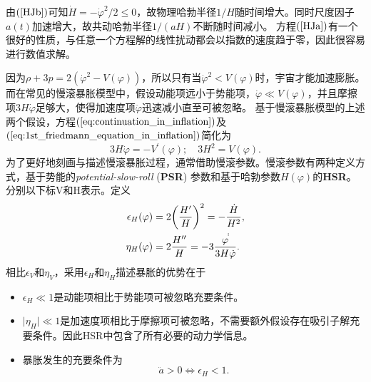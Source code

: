 由$(\ref{HJb})$可知$\dot H=-\dot \varphi^2/2\leq 0$，故物理哈勃半径$1/H$随时间增大。同时尺度因子$a(t)$加速增大，故共动哈勃半径$1/(aH)$不断随时间减小。
方程$(\ref{HJa})$有一个很好的性质，与任意一个方程解的线性扰动都会以指数的速度趋于零，因此很容易进行数值求解。

因为$\rho+3p=2{(\dot{\varphi}^2-V(\varphi))}$，所以只有当$\dot{\varphi}^2<V(\varphi)$时，宇宙才能加速膨胀。
而在常见的慢滚暴胀模型中，假设动能项远小于势能项，$\dot{\varphi}\ll
V(\varphi)$，并且摩擦项$3H\dot{\varphi}$足够大，使得加速度项$\ddot{\varphi}$迅速减小直至可被忽略。
基于慢滚暴胀模型的上述两个假设，方程$(\ref{eq:continuation_in_inflation})$及$(\ref{eq:1st_friedmann_equation_in_inflation})$简化为
\begin{equation}
  \label{eq:friedmann_equation_in_slow_roll_inflation}
  3H\dot{\varphi} = -V^\prime(\varphi);\quad 3H^2=V(\varphi).
\end{equation}
为了更好地刻画与描述慢滚暴胀过程，通常借助慢滚参数。慢滚参数有两种定义方式，基于势能的\textit{potential-slow-roll}
(\textbf{PSR}) 参数和基于哈勃参数$H(\varphi)$的\textbf{HSR}。
分别以下标V和H表示。定义
\begin{align}
  \label{eq:HSRA_epsilon_and_eta}
  \epsilon_H(\varphi) &= 2
  {\left(\frac{H^{\prime}}{H}\right)}^2=-\frac{\dot{H}}{H^2}, \\
  \eta_H(\varphi) &= 2 \frac{H^{\prime\prime}}{H}=-3
  \frac{\varphi^{\dot\dot}}{3H\dot{\varphi}}.
\end{align}
相比$\epsilon_V$和$\eta_V$，采用$\epsilon_H$和$\eta_H$描述暴胀的优势在于
\begin{itemize}
  \item $\epsilon_H\ll 1$是动能项相比于势能项可被忽略充要条件。\\
  \item $\lvert \eta_H\rvert \ll
    1$是加速度项相比于摩擦项可被忽略，不需要额外假设存在吸引子解充要条件。因此HSR中包含了所有必要的动力学信息。 \\
  \item 暴胀发生的充要条件为
    \begin{equation}
      \ddot{a} > 0 \Longleftrightarrow \epsilon_H < 1. 
    \end{equation}
\end{itemize}



